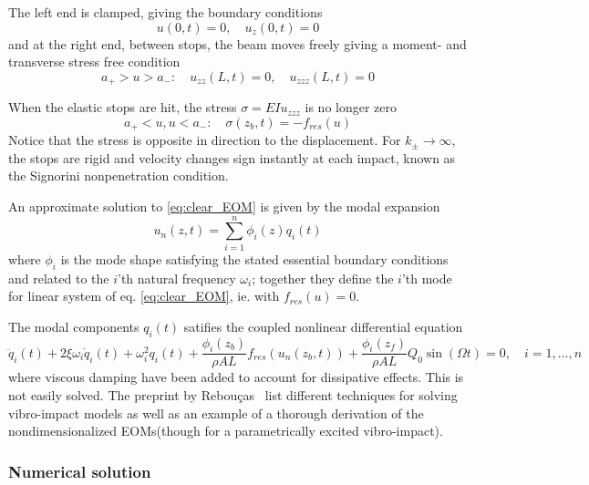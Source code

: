 The left end is clamped, giving the boundary conditions
\begin{equation}
  u(0,t) = 0, \quad u_z(0,t) = 0
\end{equation}
and at the right end, between stops, the beam moves freely giving a moment-
and transverse stress free condition
\begin{equation}
 a_+ > u > a_-: \quad u_{zz}(L,t) = 0, \quad u_{zzz}(L,t) = 0
\end{equation}

When the elastic stops are hit, the stress $\sigma = EIu_{zzz}$ is no longer
zero
\begin{equation}
  a_+ < u, u < a_-: \quad \sigma(z_b,t) = - f_{res}(u)
\end{equation}
Notice that the stress is opposite in direction to the displacement. For $k_\pm
\to \infty$, the stops are rigid and velocity changes sign instantly at each
impact, known as the Signorini nonpenetration condition.


An approximate solution to \eqref{eq:clear_EOM} is given by the modal expansion
\begin{equation}
  \label{eq:clear_modal}
  u_n(z,t) = \sum_{i=1}^n \phi_i(z) q_i(t)
\end{equation}
where $\phi_i$ is the mode shape satisfying the stated essential boundary
conditions and related to the $i$'th natural frequency
$\omega_i$; together they define the $i$'th mode for linear system of eq.
\eqref{eq:clear_EOM}, ie. with $f_{res}(u) = 0$.

The modal components $q_i(t)$ satifies the coupled nonlinear differential
equation
\begin{equation}
  \ddot q_i(t) + 2 \xi \omega_i \dot q_i(t) + \omega_i^2 q_i(t) +
  \frac{\phi_i(z_b)}{\rho A L} f_{res}(u_n(z_b,t)) +
  \frac{\phi_i(z_f) }{\rho A L}Q_0\sin(\Omega t)
  = 0, \quad
  i=1,...,n
\label{eq:clear_mode_expansion}
\end{equation}
where viscous damping have been added to account for dissipative effects.
This is not easily solved. The preprint by Rebouças~\autocite{reboucas2017a}
list different techniques for solving vibro-impact models as well as an example
of a thorough derivation of the nondimensionalized EOMs(though for a
parametrically excited vibro-impact).

\subsubsection{Numerical solution}

